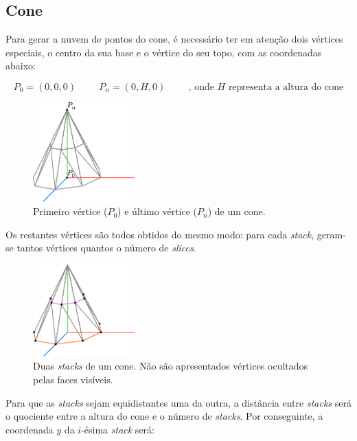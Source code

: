 \documentclass[12pt, a4paper]{article}
\begin{document}
\subsection{Cone}

Para gerar a nuvem de pontos do cone, é necessário ter em atenção dois vértices especiais, o centro
da sua base e o vértice do seu topo, com as coordenadas abaixo:

$$
P_0 = (0, 0, 0)
\hspace{1cm}
P_n = (0, H, 0)
\hspace{1cm}
\text{, onde $H$ representa a altura do cone}
$$

\begin{figure}[H]
    \centering
    \includegraphics[width=0.35\textwidth]{res/phase1/figures/Cone1.pdf}
    \caption{Primeiro vértice ($P_0$) e último vértice ($P_n$) de um cone.}
\end{figure}

Os restantes vértices são todos obtidos do mesmo modo: para cada \emph{stack}, geram-se tantos
vértices quantos o número de \emph{slices}.

\begin{figure}[H]
    \centering
    \includegraphics[width=0.35\textwidth]{res/phase1/figures/Cone2.pdf}
    \caption{
        Duas \emph{stacks} de um cone. Não são apresentados vértices ocultados pelas faces visíveis.
    }
\end{figure}

Para que as \emph{stacks} sejam equidistantes uma da outra, a distância entre \emph{stacks} será
o quociente entre a altura do cone e o número de \emph{stacks}. Por conseguinte, a coordenada $y$ da
$i$-ésima \emph{stack} será:
\end{document}
